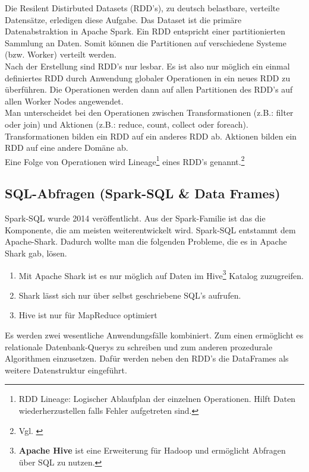 \noindent
Die Resilent Distirbuted Datasets (RDD's), zu deutsch belastbare, verteilte Datensätze, erledigen diese Aufgabe. Das Dataset ist die primäre Datenabstraktion in Apache Spark. 
Ein RDD entspricht einer partitionierten Sammlung an Daten. Somit können die Partitionen auf verschiedene Systeme (bzw. Worker) verteilt werden.  \\
Nach der Erstellung sind RDD's nur lesbar. Es ist also nur möglich ein einmal definiertes RDD durch Anwendung globaler Operationen in ein neues RDD zu überführen. Die Operationen werden dann auf allen Partitionen des RDD's auf allen Worker Nodes angewendet. \\
\noindent
Man unterscheidet bei den Operationen zwischen Transformationen (z.B.: filter oder join) und Aktionen (z.B.: reduce, count, collect oder foreach). Transformationen bilden ein RDD auf ein anderes RDD ab. Aktionen bilden ein RDD auf eine andere Domäne ab.\\ %
\noindent
Eine Folge von Operationen wird Lineage\footnote{RDD Lineage: Logischer Ablaufplan der einzelnen Operationen. Hilft Daten wiederherzustellen falls Fehler aufgetreten sind.} eines RDD's genannt.\footnote{Vgl. \cite{ZC+12}}



\newpage
\subsection{SQL-Abfragen (Spark-SQL \& Data Frames)}\label{sec_sparksql}

Spark-SQL wurde 2014 veröffentlicht. Aus der Spark-Familie ist das die Komponente, die am meisten weiterentwickelt wird.
Spark-SQL entstammt dem Apache-Shark. Dadurch wollte man die folgenden Probleme, die es in Apache Shark gab, lösen.
\begin{enumerate}
	\item Mit Apache Shark ist es nur möglich auf Daten im Hive\footnote{\textbf{Apache Hive} ist eine Erweiterung für Hadoop und ermöglicht Abfragen über SQL zu nutzen.} Katalog zuzugreifen. 
	\item Shark lässt sich nur über selbst geschriebene SQL's aufrufen. 
	\item Hive ist nur für MapReduce optimiert
\end{enumerate}

\noindent
Es werden zwei wesentliche Anwendungsfälle kombiniert. Zum einen ermöglicht es relationale Datenbank-Querys zu schreiben und zum anderen prozedurale Algorithmen einzusetzen. 
Dafür werden neben den RDD's die DataFrames als weitere Datenstruktur eingeführt.\\

